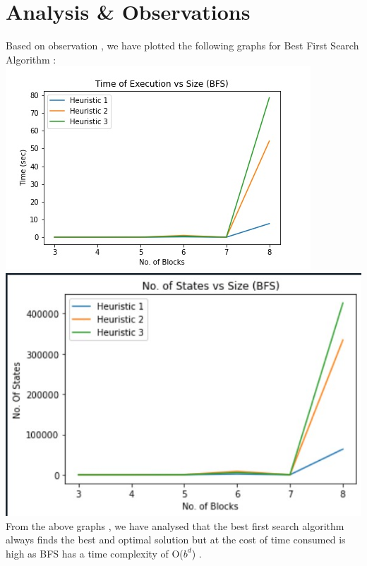 \documentclass{article}
\begin{document}
\section{Analysis \& Observations}
\vspace{5pt}
Based on observation , we have plotted the following graphs for Best First Search Algorithm :
\\\includegraphics[scale=0.9]{Graph.jpg}
\includegraphics{Graph1.jpg}
\vspace{5pt}
\\From the above graphs , we have analysed that the best first search algorithm always finds the best and optimal solution
but at the cost of time consumed is high as BFS has a time complexity of O($b^d$) .
\newpage
\end{document}
